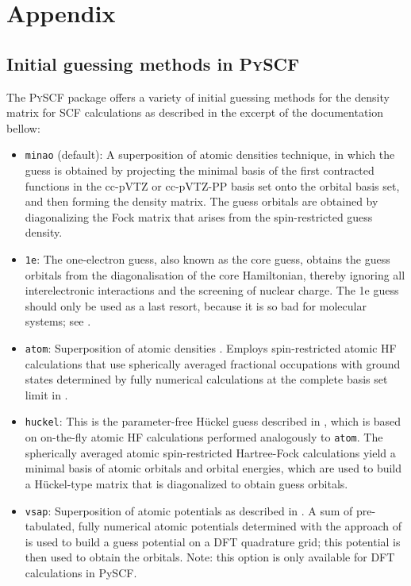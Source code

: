 \appendix
\chapter{Appendix}
\label{sec:appendix}

\section{Initial guessing methods in \textsc{PySCF} \parencite{ref:pyscf}}
\label{sec:pyscf_initial_guessing_methods}
The \textsc{PySCF} package offers a variety of initial guessing methods for the density matrix for SCF calculations as described in the excerpt of the documentation \parencite{ref:pyscf_user_guide} bellow: 
\begin{itemize}
    \item \texttt{minao} (default): A superposition of atomic densities \parencite{ref:minao_sad1,ref:minao_sad2} technique, in which the guess is obtained by projecting the minimal basis of the first contracted functions in the cc-pVTZ or cc-pVTZ-PP basis set onto the orbital basis set, and then forming the density matrix. The guess orbitals are obtained by diagonalizing the Fock matrix that arises from the spin-restricted guess density.

    \item \texttt{1e}: The one-electron guess, also known as the core guess, obtains the guess orbitals from the diagonalisation of the core Hamiltonian, thereby ignoring all interelectronic interactions and the screening of nuclear charge. The 1e guess should only be used as a last resort, because it is so bad for molecular systems; see \parencite{ref:Lehtola2019}.

    \item \texttt{atom}: Superposition of atomic densities \parencite{ref:minao_sad1,ref:minao_sad2}. Employs spin-restricted atomic HF calculations that use spherically averaged fractional occupations with ground states determined by fully numerical calculations at the complete basis set limit in \parencite{ref:lethola_fully_numerical_atomic_potentials}.

    \item \texttt{huckel}: This is the parameter-free Hückel guess described in \parencite{ref:Lehtola2019}, which is based on on-the-fly atomic HF calculations performed analogously to \texttt{atom}. The spherically averaged atomic spin-restricted Hartree-Fock calculations yield a minimal basis of atomic orbitals and orbital energies, which are used to build a Hückel-type matrix that is diagonalized to obtain guess orbitals.

    \item \texttt{vsap}: Superposition of atomic potentials as described in \parencite{ref:Lehtola2019}. A sum of pre-tabulated, fully numerical atomic potentials determined with the approach of \parencite{ref:lethola_fully_numerical_atomic_potentials} is used to build a guess potential on a DFT quadrature grid; this potential is then used to obtain the orbitals. Note: this option is only available for DFT calculations in PySCF.
\end{itemize}



